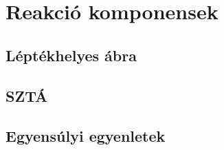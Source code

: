 \section{Reakció komponensek}

\subsection{Léptékhelyes ábra}

\subsection{SZTÁ}

\subsection{Egyensúlyi egyenletek}
